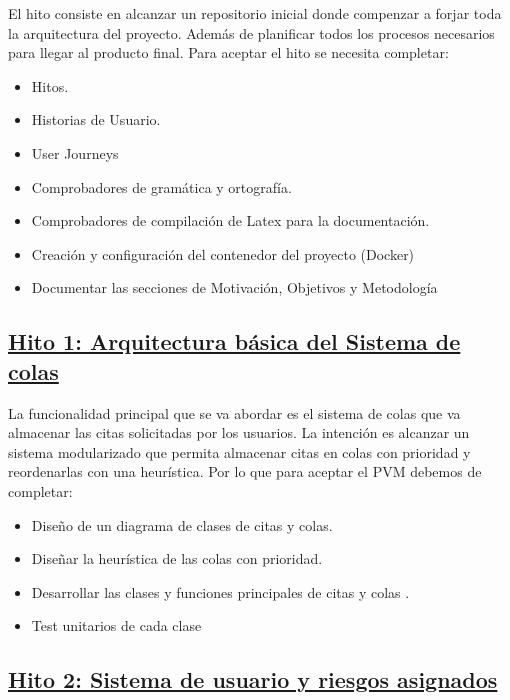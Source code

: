 El hito consiste en alcanzar un repositorio inicial donde compenzar a forjar toda la arquitectura del proyecto.
Además de planificar todos los procesos necesarios para llegar al producto final. Para aceptar el hito se necesita completar:

\begin{itemize}
    \item{Hitos.}
    \item{Historias de Usuario.}
    \item{User Journeys}
    \item{Comprobadores de gramática y ortografía.}
    \item{Comprobadores de compilación de Latex para la documentación.}
    \item{Creación y configuración del contenedor del proyecto (Docker)}
    \item{Documentar las secciones de Motivación, Objetivos y Metodología}
\end{itemize}

\subsection*{\href{https://github.com/RubenDelgadoPareja/TFG-Triage-Inteligente-Consulta-Medica/milestone/2}{Hito 1: Arquitectura básica del Sistema de colas}}

La funcionalidad principal que se va abordar es el sistema de colas que va almacenar las citas solicitadas por los usuarios.
La intención es alcanzar un sistema modularizado que permita almacenar citas en colas con prioridad y reordenarlas con una heurística.
Por lo que para aceptar el PVM debemos de completar: 

\begin{itemize}
    \item{Diseño de un diagrama de clases de citas y colas.}
    \item{Diseñar la heurística de las colas con prioridad.}
    \item{Desarrollar las clases y funciones principales de citas y colas .}
    \item{Test unitarios de cada clase}    
\end{itemize}

\subsection*{\href{https://github.com/RubenDelgadoPareja/TFG-Triage-Inteligente-Consulta-Medica/milestone/3}{Hito 2: Sistema de usuario y riesgos asignados}}

